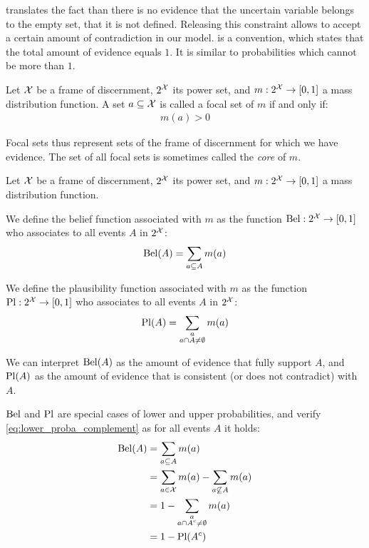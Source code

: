 \begin{remark}
     translates the fact than there is no evidence that the uncertain variable belongs to the empty set, \ie that it is not defined. Releasing this constraint allows to accept a certain amount of contradiction in our model.
     is a convention, which states that the total amount of evidence equals $1$. It is similar to probabilities which cannot be more than $1$. 
\end{remark}

\begin{definition}\label{def:focal_set}
    Let $\mathcal{X}$ be a frame of discernment, $2^{\mathcal{X}}$ its power set, and $m:2^{\mathcal{X}}\rightarrow[0,1]$ a mass distribution function. A set $a\subseteq\mathcal{X}$ is called a focal set of $m$ if and only if:
    \begin{align}
        m(a)>0\label{eq:focal_set}
    \end{align}
\end{definition}
Focal sets thus represent sets of the frame of discernment for which we have evidence. The set of all focal sets is sometimes called the \textit{core} of $m$.

\begin{definition}\label{def:belief_plausibility}
    Let $\mathcal{X}$ be a frame of discernment, $2^{\mathcal{X}}$ its power set, and $m:2^{\mathcal{X}}\rightarrow[0,1]$ a mass distribution function.
    
    We define the belief function associated with $m$ as the function $\mathrm{Bel}:2^{\mathcal{X}}\rightarrow[0,1]$ who associates to all events $A$ in $2^{\mathcal{X}}$:
    \begin{align*}
        \mathrm{Bel}(A)=\sum_{a\subseteq A} m(a)
    \end{align*}
    
    We define the plausibility function associated with $m$ as the function $\mathrm{Pl} :2^{\mathcal{X}}\rightarrow[0,1]$ who associates to all events $A$ in $2^{\mathcal{X}}$:
    \begin{align*}
        \mathrm{Pl}(A)=\sum_{\substack{a\\a\cap A\neq\emptyset}} m(a)
    \end{align*}
\end{definition}
We can interpret $\mathrm{Bel}(A)$ as the amount of evidence that fully support $A$, and $\mathrm{Pl}(A)$ as the amount of evidence that is consistent (or does not contradict) with $A$.

$\mathrm{Bel}$ and $\mathrm{Pl}$ are special cases of lower and upper probabilities, and verify \eqref{eq:lower_proba_complement} as for all events $A$ it holds:
\begin{align*}
    \mathrm{Bel}(A)&=\sum_{a\subseteq A} m(a)\\
    &= \sum_{a\in \mathcal{X}} m(a) - \sum_{a\not\subseteq A} m(a)\\
    &= 1 - \sum_{\substack{a\\a\cap A^c\neq\emptyset}} m(a)\\
    &=1-\mathrm{Pl}(A^c)
\end{align*}

